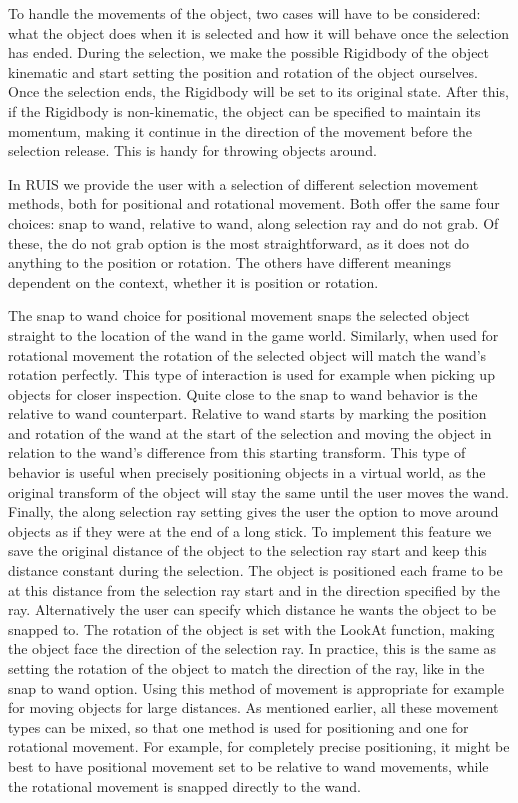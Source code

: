 \documentclass[12pt,a4paper,oneside,pdftex]{report}
\begin{document}
To handle the movements of the object, two cases will have to be considered: what the object does when it is selected and how it will behave once the selection has ended. During the selection, we make the possible Rigidbody of the object kinematic and start setting the position and rotation of the object ourselves. Once the selection ends, the Rigidbody will be set to its original state. After this, if the Rigidbody is non-kinematic, the object can be specified to maintain its momentum, making it continue in the direction of the movement before the selection release. This is handy for throwing objects around.

In RUIS we provide the user with a selection of different selection movement methods, both for positional and rotational movement. Both offer the same four choices: snap to wand, relative to wand, along selection ray and do not grab. Of these, the do not grab option is the most straightforward, as it does not do anything to the position or rotation. The others have different meanings dependent on the context, whether it is position or rotation.

The snap to wand choice for positional movement snaps the selected object straight to the location of the wand in the game world. Similarly, when used for rotational movement the rotation of the selected object will match the wand's rotation perfectly. This type of interaction is used for example when picking up objects for closer inspection. Quite close to the snap to wand behavior is the relative to wand counterpart. Relative to wand starts by marking the position and rotation of the wand at the start of the selection and moving the object in relation to the wand's difference from this starting transform. This type of behavior is useful when precisely positioning objects in a virtual world, as the original transform of the object will stay the same until the user moves the wand. Finally, the along selection ray setting gives the user the option to move around objects as if they were at the end of a long stick. To implement this feature we save the original distance of the object to the selection ray start and keep this distance constant during the selection. The object is positioned each frame to be at this distance from the selection ray start and in the direction specified by the ray. Alternatively the user can specify which distance he wants the object to be snapped to. The rotation of the object is set with the LookAt function, making the object face the direction of the selection ray. In practice, this is the same as setting the rotation of the object to match the direction of the ray, like in the snap to wand option. Using this method of movement is appropriate for example for moving objects for large distances. As mentioned earlier, all these movement types can be mixed, so that one method is used for positioning and one for rotational movement. For example, for completely precise positioning, it might be best to have positional movement set to be relative to wand movements, while the rotational movement is snapped directly to the wand.
\end{document}
